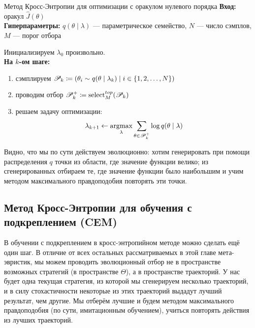 \begin{algorithm}{Метод Кросс-Энтропии для оптимизации с оракулом нулевого порядка}
\textbf{Вход:} оракул $\hat{J}(\theta)$ \\
\textbf{Гиперпараметры:} $q(\theta \mid \lambda)$ --- параметрическое семейство, $N$ --- число сэмплов, $M$ --- порог отбора

\vspace{0.3cm}
Инициализируем $\lambda_0$ произвольно. \\
\textbf{На $k$-ом шаге:}
\begin{enumerate}
    \item сэмплируем $\mathscr{P}_k \coloneqq \left( \theta_i \sim q(\theta \mid \lambda_k) \mid i \in \{1, 2, \dots, N\} \right)$
    \item проводим отбор $\mathscr{P}^{+}_k \coloneqq \mathrm{select}^{\mathop{top}}_M(\mathscr{P}_k)$
    \item решаем задачу оптимизации:
    $$\lambda_{k+1} \leftarrow \mathop{\mathrm{argmax}}_{\lambda} \sum_{\theta \in \mathscr{P}^{+}_k} \log q(\theta \mid \lambda)$$
\end{enumerate}
\end{algorithm}

Видно, что мы по сути действуем эволюционно: хотим генерировать при помощи распределения $q$ точки из области, где значение функции велико; из сгенерированных отбираем те, где значение функции было наибольшим и учим методом максимального правдоподобия повторять эти точки.

\subsection{Метод Кросс-Энтропии для обучения с подкреплением (CEM)}

В обучении с подкреплением в кросс-энтропийном методе можно сделать ещё один шаг. В отличие от всех остальных рассматриваемых в этой главе мета-эвристик, мы можем проводить эволюционный отбор не в пространстве возможных стратегий (в пространстве $\Theta$), а в пространстве траекторий. У нас будет одна текущая стратегия, из которой мы сгенерируем несколько траекторий, и в силу стохастичности некоторые из этих траекторий выдадут лучший результат, чем другие. Мы отберём лучшие и будем методом максимального правдоподобия (по сути, имитационным обучением), учиться повторять действия из лучших траекторий.  

